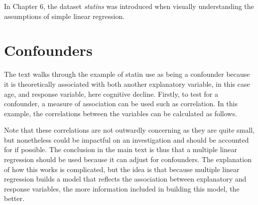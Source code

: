 

In Chapter 6, the dataset \textit{statins} was introduced when visually understanding the assumptions of simple linear regression.  




\section{Confounders} 
The text walks through the example of statin use as being a confounder because it is theoretically associated with both another explanatory variable, in this case age, and response variable, here cognitive decline.  Firstly, to test for a confounder, a measure of association can be used such as correlation.  In this example, the correlations between the variables can be calculated as follows.  

\begin{knitrout}
\color{fgcolor}\begin{kframe}
\begin{alltt}
\hlopt{$}\hlopt{$}
\end{alltt}


{\ttfamily\noindent\bfseries\color{errorcolor}{\#\# Error in is.data.frame(y): object 'statins' not found}}\begin{alltt}
\hlopt{$}\hlopt{$}
\end{alltt}


{\ttfamily\noindent\bfseries\color{errorcolor}{\#\# Error in is.data.frame(y): object 'statins' not found}}\end{kframe}
\end{knitrout}

Note that these correlations are not outwardly concerning as they are quite small, but nonetheless could be impactful on an investigation and should be accounted for if possible.  The conclusion in the main text is thus that a multiple linear regression should be used because it can adjust for confounders.  The explanation of how this works is complicated, but the idea is that because multiple linear regression builds a model that reflects the association between explanatory and response variables, the more information included in building this model, the better.  

